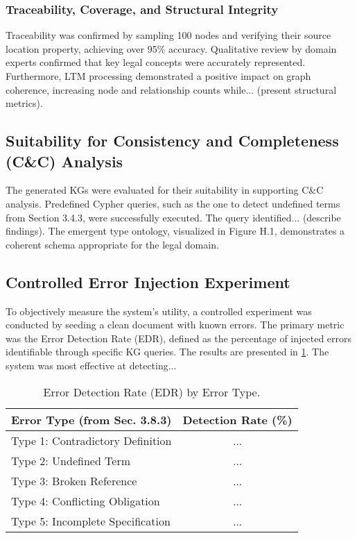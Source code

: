 \subsubsection{Traceability, Coverage, and Structural Integrity}
Traceability was confirmed by sampling 100 nodes and verifying their source location property, achieving over 95\% accuracy. Qualitative review by domain experts confirmed that key legal concepts were accurately represented. Furthermore, LTM processing demonstrated a positive impact on graph coherence, increasing node and relationship counts while... (present structural metrics).

\subsection{Suitability for Consistency and Completeness (C\&C) Analysis}
\label{subsec:candc_suitability}
The generated KGs were evaluated for their suitability in supporting C\&C analysis. Predefined Cypher queries, such as the one to detect undefined terms from Section 3.4.3, were successfully executed. The query identified... (describe findings). The emergent type ontology, visualized in Figure H.1, demonstrates a coherent schema appropriate for the legal domain.

\subsection{Controlled Error Injection Experiment}
\label{subsec:error_injection}
To objectively measure the system's utility, a controlled experiment was conducted by seeding a clean document with known errors. The primary metric was the Error Detection Rate (EDR), defined as the percentage of injected errors identifiable through specific KG queries. The results are presented in \cref{tab:edr_results}. The system was most effective at detecting...

\begin{table}[h!]
\centering
\caption{Error Detection Rate (EDR) by Error Type.}
\label{tab:edr_results}
\begin{tabular}{|l|c|}
\hline
\textbf{Error Type (from Sec. 3.8.3)} & \textbf{Detection Rate (\%)} \\
\hline
Type 1: Contradictory Definition & ... \\
Type 2: Undefined Term & ... \\
Type 3: Broken Reference & ... \\
Type 4: Conflicting Obligation & ... \\
Type 5: Incomplete Specification & ... \\
\hline
\end{tabular}
\end{table}

